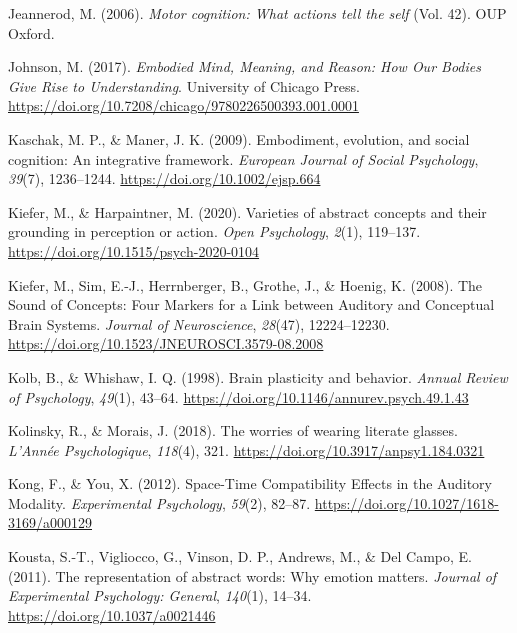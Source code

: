 \documentclass[
  a4paper,12pt,twoside,onecolumn,openright,final,oldfontcommands]{memoir}
\newlength{\cslhangindent}
\newlength{\cslentryspacingunit} %
\newenvironment{CSLReferences}[2] %
 {%
  \setlength{\parindent}{0pt}
  \ifodd #1
  \let\oldpar\par
  \def\par{\hangindent=\cslhangindent\oldpar}
  \fi
  \setlength{\parskip}{#2\cslentryspacingunit}
 }%
 {}
\begin{document}
\begin{CSLReferences}{1}{0}
\leavevmode{}%
Jeannerod, M. (2006). \emph{Motor cognition: {What} actions tell the self} (Vol. 42). OUP Oxford.

\leavevmode{}%
Johnson, M. (2017). \emph{Embodied {Mind}, {Meaning}, and {Reason}: {How} {Our} {Bodies} {Give} {Rise} to {Understanding}}. University of Chicago Press. \url{https://doi.org/10.7208/chicago/9780226500393.001.0001}

\leavevmode{}%
Kaschak, M. P., \& Maner, J. K. (2009). Embodiment, evolution, and social cognition: {An} integrative framework. \emph{European Journal of Social Psychology}, \emph{39}(7), 1236--1244. \url{https://doi.org/10.1002/ejsp.664}

\leavevmode{}%
Kiefer, M., \& Harpaintner, M. (2020). Varieties of abstract concepts and their grounding in perception or action. \emph{Open Psychology}, \emph{2}(1), 119--137. \url{https://doi.org/10.1515/psych-2020-0104}

\leavevmode{}%
Kiefer, M., Sim, E.-J., Herrnberger, B., Grothe, J., \& Hoenig, K. (2008). The {Sound} of {Concepts}: {Four} {Markers} for a {Link} between {Auditory} and {Conceptual} {Brain} {Systems}. \emph{Journal of Neuroscience}, \emph{28}(47), 12224--12230. \url{https://doi.org/10.1523/JNEUROSCI.3579-08.2008}

\leavevmode{}%
Kolb, B., \& Whishaw, I. Q. (1998). Brain plasticity and behavior. \emph{Annual Review of Psychology}, \emph{49}(1), 43--64. \url{https://doi.org/10.1146/annurev.psych.49.1.43}

\leavevmode{}%
Kolinsky, R., \& Morais, J. (2018). The worries of wearing literate glasses. \emph{L'Année Psychologique}, \emph{118}(4), 321. \url{https://doi.org/10.3917/anpsy1.184.0321}

\leavevmode{}%
Kong, F., \& You, X. (2012). Space-{Time} {Compatibility} {Effects} in the {Auditory} {Modality}. \emph{Experimental Psychology}, \emph{59}(2), 82--87. \url{https://doi.org/10.1027/1618-3169/a000129}

\leavevmode{}%
Kousta, S.-T., Vigliocco, G., Vinson, D. P., Andrews, M., \& Del Campo, E. (2011). The representation of abstract words: {Why} emotion matters. \emph{Journal of Experimental Psychology: General}, \emph{140}(1), 14--34. \url{https://doi.org/10.1037/a0021446}


\end{CSLReferences}
\end{document}
